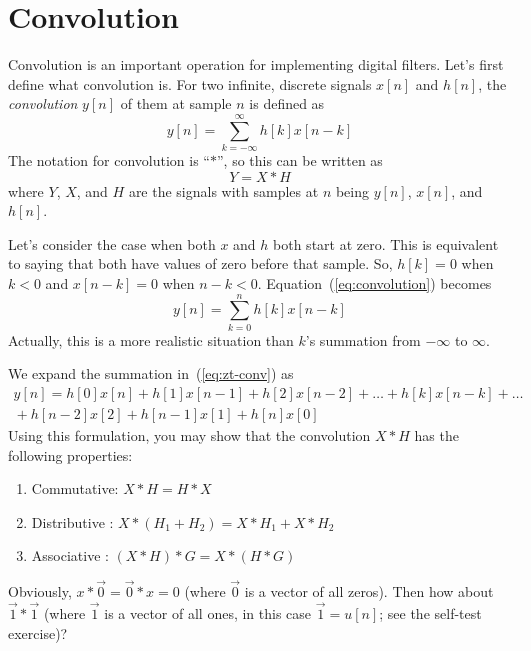 \section{Convolution}
\label{sc:convolution}

 Convolution is an important
operation for implementing digital filters.  Let's first define what
convolution is. For two infinite, discrete signals $x[n]$ and $h[n]$,
the \emph{convolution} $y[n]$ of them at sample $n$ is defined as
\begin{equation}
y[n] = \sum_{k=-\infty}^{\infty} h[k] x[n-k]
\label{eq:convolution}
\end{equation}
The notation for convolution is ``$\ast$'', so this can be written as 
\begin{equation}
Y = X \ast H
\end{equation}
where $Y$, $X$, and $H$ are the signals with samples at $n$ being
$y[n]$, $x[n]$, and $h[n]$.

Let's consider the case when both $x$ and $h$ both start at zero. This
is equivalent to saying that both have values of zero before that
sample. So, $h[k] = 0$ when $k<0$ and $x[n-k]=0$ when
$n-k<0$. Equation~(\ref{eq:convolution}) becomes
\begin{equation}
y[n] = \sum_{k=0}^{n} h[k] x[n-k]
\label{eq:zt-conv}
\end{equation}
Actually, this is a more realistic situation than $k$'s summation
from $-\infty$ to $\infty$.

We expand the summation in~(\ref{eq:zt-conv}) as
\begin{multline}
y[n] = h[0] x[n] + h[1] x[n-1] + h[2] x[n-2] + \ldots + h[k] x[n-k]
       + \ldots \\
       {}+ h[n-2] x[2] + h[n-1] x[1] + h[n] x[0]
\label{eq:zt-conv-exp}
\end{multline}
Using this formulation, you may show that the convolution $X \ast H$ has the
following properties:
\begin{enumerate}
\item Commutative: $X \ast H=H \ast X$
\item Distributive :  $X \ast (H_1 + H_2)=X \ast H_1 + X \ast H_2$
\item Associative : $(X \ast H) \ast G = X \ast (H \ast G)$
\end{enumerate}
Obviously, $x \ast \vec{0} = \vec{0} \ast x = 0$ (where $\vec{0}$ is a
vector of all zeros). Then how about $\vec{1} \ast \vec{1}$ (where
$\vec{1}$ is a vector of all ones, in this case $\vec{1}=u[n]$; see
the self-test exercise)?

